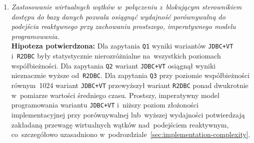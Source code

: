 \begin{enumerate}[label=\textbf{H\arabic*.}]
    \item \textit{Zastosowanie wirtualnych wątków w~połączeniu z~blokującym sterownikiem dostępu do bazy danych pozwala osiągnąć wydajność porównywalną do podejścia reaktywnego przy zachowaniu prostszego, imperatywnego modelu programowania.} \\[0.5em] \textbf{Hipoteza potwierdzona:} Dla zapytania \texttt{Q1} wyniki wariantów \texttt{JDBC+VT} i~\texttt{R2DBC} były statystycznie nierozróżnialne na~wszystkich poziomach współbieżności. Dla zapytania \texttt{Q2} wariant \texttt{JDBC+VT} osiągnął wyniki nieznacznie wyższe od~\texttt{R2DBC}. Dla zapytania \texttt{Q3} przy poziomie współbieżności równym~1024 wariant \texttt{JDBC+VT} przewyższył wariant \texttt{R2DBC} ponad dwukrotnie w~pomiarze wartości średniego czasu. Prostszy, imperatywny model programowania wariantu \texttt{JDBC+VT} i~niższy poziom złożoności implementacyjnej przy porównywalnej lub~wyższej wydajności potwierdzają zakładaną przewagę wirtualnych wątków nad~podejściem reaktywnym, co~szczegółowo uzasadniono w~podrozdziale~\ref{sec:implementation-complexity}.

\end{enumerate}

